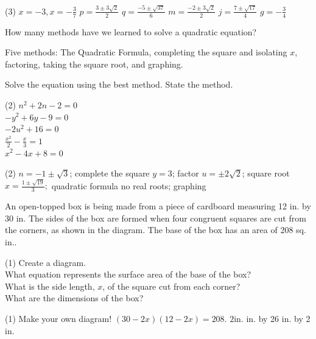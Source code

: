 \documentclass[12pt,fleqn]{book}
\newcommand{\prb}[1]{\begin{Exercise}#1\end{Exercise}}
\newcommand{\sol}[1]{\begin{Answer}#1\end{Answer}}
\begin{document}
\sol{
	\begin{tasks}(3)
		\task $x=-3, x=-\frac{3}{7}$
		\task $p=\frac{3 \pm 3 \sqrt{2}}{2}$
		\task $q=\frac{-5 \pm \sqrt{37}}{6}$
		\task $m=\frac{-2 \pm 3 \sqrt{2}}{2}$
		\task $j=\frac{7 \pm \sqrt{17}}{4}$
		\task $g=-\frac{3}{4}$
	\end{tasks}
}

\prb{How many methods have we learned to solve a quadratic equation?\\[4em]}
\sol{Five methods: The Quadratic Formula, completing the square and isolating $x$, factoring, taking the square root, and graphing.}

\prb{Solve the equation using the best method.  State the method.
	\begin{tasks}(2)
		\task $n^2+2 n-2=0$
		\\[8em]
		\task $-y^2+6 y-9=0$
		\\[8em]
		\task $-2 u^2+16=0$
		\\[8em]
		\task $\frac{x^2}{2}-\frac{x}{3}=1$
		\\[8em]
		\task $x^2-4 x+8=0$
		\\[8em]
	\end{tasks}
}
\sol{
	\begin{tasks}(2)
		\task $n=-1 \pm \sqrt{3}$; complete the square
		\task $y=3$; factor
		\task $u=\pm 2 \sqrt{2}$; square root
		\task $x=\frac{1 \pm \sqrt{19}}{3} ;$ quadratic formula
		\task no real roots; graphing
	\end{tasks}
}

\prb{An open-topped box is being made from
	a piece of cardboard measuring 12 in. by
	30 in. The sides of the box are formed
	when four congruent squares are cut from
	the corners, as shown in the diagram. The
	base of the box has an area of 208 sq. in..
	\begin{tasks}(1)
		\task Create a diagram.
		\\[10em]
		\task What equation represents the surface area of the base of the box?
		\\[4em]
		\task What is the side length, $x$, of the square cut from each corner?
		\\[4em]
		\task What are the dimensions of the box?
		\\[4em]
	\end{tasks}
}
\sol{
	\begin{tasks}(1)
		\task Make your own diagram!
		\task $(30-2 x)(12-2 x)=208$.
		\task $2 \mathrm{in}$.
		\task 8 in. by 26 in. by 2 in.
	\end{tasks}
}
\end{document}
